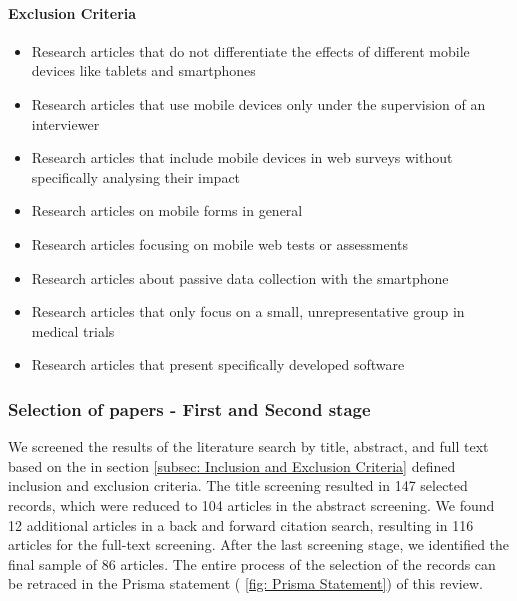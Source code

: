 \paragraph{Exclusion Criteria}
\begin{itemize}
    \item Research articles that do not differentiate the effects of different mobile devices like tablets and smartphones
    \item Research articles that use mobile devices only under the supervision of an interviewer
    \item Research articles that include mobile devices in web surveys without specifically analysing their impact
    \item Research articles on mobile forms in general
    \item Research articles focusing on mobile web tests or assessments
    \item Research articles about passive data collection with the smartphone
    \item Research articles that only focus on a small, unrepresentative group in medical trials
    \item Research articles that present specifically developed software
\end{itemize}

\subsubsection{Selection of papers - First and Second stage}

We screened the results of the literature search by title, abstract, and full text based on the in section \ref{subsec: Inclusion and Exclusion Criteria} defined inclusion and exclusion criteria. The title screening resulted in 147 selected records, which were reduced to 104 articles in the abstract screening. We found 12 additional articles in a back and forward citation search, resulting in 116 articles for the full-text screening. After the last screening stage, we identified the final sample of 86 articles. The entire process of the selection of the records can be retraced in the Prisma statement ( \ref{fig: Prisma Statement}) of this review.

